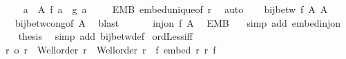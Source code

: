 \begin{isabellebody}
\ \ \isamarkupfalse%
\ {\isachardoublequoteopen}{\isasymforall}a\ {\isasymin}\ {\isacharquery}{\kern0pt}A{}{\isachardot}{\kern0pt}\ f\ a\ {\isacharequal}{\kern0pt}\ g\ a{\isachardoublequoteclose}\isanewline
\ \ \isamarkupfalse%
\ {}\ EMB\ embed{\isacharunderscore}{\kern0pt}unique{\isacharbrackleft}{\kern0pt}of\ r{}{\isacharbrackright}{\kern0pt}\ \isamarkupfalse%
\ auto\isanewline
\ \ \isamarkupfalse%
\ {\isachardoublequoteopen}{\isasymnot}{\isacharparenleft}{\kern0pt}bij{\isacharunderscore}{\kern0pt}betw\ f\ {\isacharquery}{\kern0pt}A{}\ {\isacharquery}{\kern0pt}A{}{\isacharparenright}{\kern0pt}{\isachardoublequoteclose}\isanewline
\ \ \isamarkupfalse%
\ {}\ bij{\isacharunderscore}{\kern0pt}betw{\isacharunderscore}{\kern0pt}cong{\isacharbrackleft}{\kern0pt}of\ {\isacharquery}{\kern0pt}A{}{\isacharbrackright}{\kern0pt}\ \isamarkupfalse%
\ blast\isanewline
\ \ \isamarkupfalse%
\isanewline
\ \ \isamarkupfalse%
\ {\isachardoublequoteopen}inj{\isacharunderscore}{\kern0pt}on\ f\ {\isacharquery}{\kern0pt}A{}{\isachardoublequoteclose}\ \isamarkupfalse%
\ EMB\ {}\ \isamarkupfalse%
\ {\isacharparenleft}{\kern0pt}simp\ add{\isacharcolon}{\kern0pt}\ embed{\isacharunderscore}{\kern0pt}inj{\isacharunderscore}{\kern0pt}on{\isacharparenright}{\kern0pt}\isanewline
\ \ \isamarkupfalse%
\ \isamarkupfalse%
\ {\isacharquery}{\kern0pt}thesis\ \isamarkupfalse%
\ {\isacharparenleft}{\kern0pt}simp\ add{\isacharcolon}{\kern0pt}\ bij{\isacharunderscore}{\kern0pt}betw{\isacharunderscore}{\kern0pt}def{\isacharparenright}{\kern0pt}\isanewline
{}\isamarkupfalse%
%
\endisatagproof
{\isafoldproof}%
%
\isadelimproof
\isanewline
%
\endisadelimproof
\isanewline
{}\isamarkupfalse%
\ ordLess{\isacharunderscore}{\kern0pt}iff{\isacharcolon}{\kern0pt}\isanewline
{\isachardoublequoteopen}r\ {\isacharless}{\kern0pt}o\ r{\isacharprime}{\kern0pt}\ {\isacharequal}{\kern0pt}\ {\isacharparenleft}{\kern0pt}Well{\isacharunderscore}{\kern0pt}order\ r\ {\isasymand}\ Well{\isacharunderscore}{\kern0pt}order\ r{\isacharprime}{\kern0pt}\ {\isasymand}\ {\isasymnot}{\isacharparenleft}{\kern0pt}{\isasymexists}f{\isacharprime}{\kern0pt}{\isachardot}{\kern0pt}\ embed\ r{\isacharprime}{\kern0pt}\ r\ f{\isacharprime}{\kern0pt}{\isacharparenright}{\kern0pt}{\isacharparenright}{\kern0pt}{\isachardoublequoteclose}\isanewline

\end{isabellebody}
